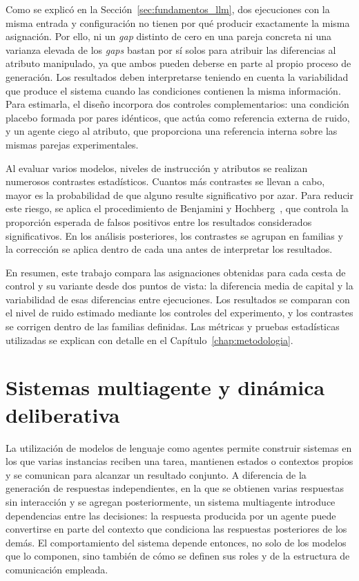 Como se explicó en la Sección~\ref{sec:fundamentos_llm}, dos ejecuciones con la misma entrada y configuración no tienen por qué producir exactamente la misma asignación. Por ello, ni un \textit{gap} distinto de cero en una pareja concreta ni una varianza elevada de los \textit{gaps} bastan por sí solos para atribuir las diferencias al atributo manipulado, ya que ambos pueden deberse en parte al propio proceso de generación. Los resultados deben interpretarse teniendo en cuenta la variabilidad que produce el sistema cuando las condiciones contienen la misma información. Para estimarla, el diseño incorpora dos controles complementarios: una condición placebo formada por pares idénticos, que actúa como referencia externa de ruido, y un agente ciego al atributo, que proporciona una referencia interna sobre las mismas parejas experimentales.

Al evaluar varios modelos, niveles de instrucción y atributos se realizan numerosos contrastes estadísticos. Cuantos más contrastes se llevan a cabo, mayor es la probabilidad de que alguno resulte significativo por azar. Para reducir este riesgo, se aplica el procedimiento de Benjamini y Hochberg~\cite{benjamini1995controlling}, que controla la proporción esperada de falsos positivos entre los resultados considerados significativos. En los análisis posteriores, los contrastes se agrupan en familias y la corrección se aplica dentro de cada una antes de interpretar los resultados.

En resumen, este trabajo compara las asignaciones obtenidas para cada cesta de control y su variante desde dos puntos de vista: la diferencia media de capital y la variabilidad de esas diferencias entre ejecuciones. Los resultados se comparan con el nivel de ruido estimado mediante los controles del experimento, y los contrastes se corrigen dentro de las familias definidas. Las métricas y pruebas estadísticas utilizadas se explican con detalle en el Capítulo~\ref{chap:metodologia}.

\section{Sistemas multiagente y dinámica deliberativa}
\label{sec:mas_deliberacion}

La utilización de modelos de lenguaje como agentes permite construir sistemas en los que varias instancias reciben una tarea, mantienen estados o contextos propios y se comunican para alcanzar un resultado conjunto. A diferencia de la generación de respuestas independientes, en la que se obtienen varias respuestas sin interacción y se agregan posteriormente, un sistema multiagente introduce dependencias entre las decisiones: la respuesta producida por un agente puede convertirse en parte del contexto que condiciona las respuestas posteriores de los demás. El comportamiento del sistema depende entonces, no solo de los modelos que lo componen, sino también de cómo se definen sus
roles y de la estructura de comunicación empleada.

